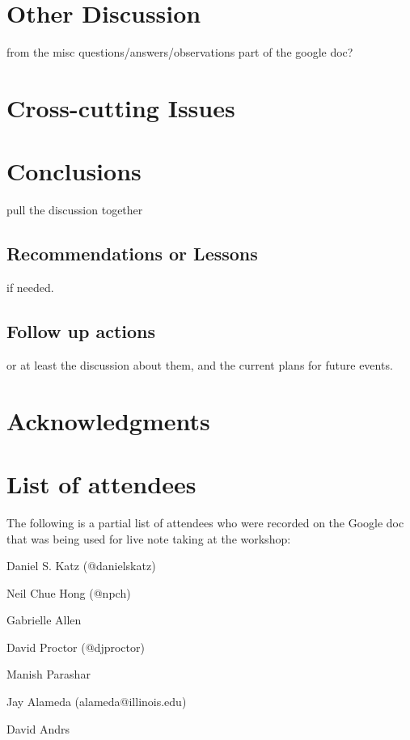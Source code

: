 \documentclass[11pt, oneside]{amsart}
\begin{document}
\section{Other Discussion}

from the misc questions/answers/observations part of the google doc?

\section{Cross-cutting Issues}

\section{Conclusions}

pull the discussion together

\subsection{Recommendations or Lessons}

if needed.

\subsection{Follow up actions}

or at least the discussion about them, and the current plans for future events.

\section*{Acknowledgments}

\appendix
\section{List of attendees}

The following is a partial list of attendees who were recorded on the Google doc that was being used for live note taking at the workshop:

Daniel S. Katz (@danielskatz)

Neil Chue Hong (@npch)

Gabrielle Allen

David Proctor (@djproctor)

Manish Parashar

Jay Alameda (alameda@illinois.edu)

David Andrs
\end{document}
